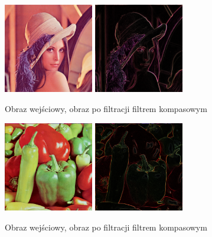 \documentclass[final,a4paper,openany,12pt]{mwbk}
\begin{document}
\begin{figure}[H]
	\begin{center}
		\includegraphics[width=0.35\textwidth]{lena_color}
		\includegraphics[width=0.35\textwidth]{lena_color_compassSobol_result}
	\end{center}
	\caption{Obraz wejściowy, obraz po filtracji filtrem kompasowym}
\end{figure}

\begin{figure}[H]
	\begin{center}
		\includegraphics[width=0.35\textwidth]{peppers_color}
		\includegraphics[width=0.35\textwidth]{peppers_color_compassSobol_result}
	\end{center}
	\caption{Obraz wejściowy, obraz po filtracji filtrem kompasowym}
\end{figure}
\end{document}
